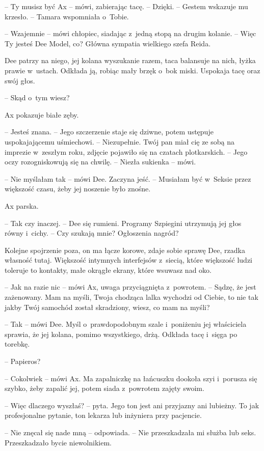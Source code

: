 \documentclass[oneside,polish,11pt,sfheadings]{mwbk}
\begin{document}
-- Ty musisz być Ax -- mówi, zabierając tacę. -- Dzięki. -- Gestem wskazuje
mu krzesło. -- Tamara wspomniała o~Tobie.

-- Wzajemnie -- mówi chłopiec, siadając z~jedną stopą na drugim kolanie. -- Więc Ty jesteś Dee Model, co? Główna sympatia wielkiego szefa Reida.

Dee patrzy na niego, jej kolana wyszukanie razem, taca balansuje na
nich, łyżka prawie w~ustach. Odkłada ją, robiąc mały brzęk o~bok miski.
Uspokaja tacę oraz swój głos.

-- Skąd o~tym wiesz?

Ax pokazuje białe zęby. 

-- Jesteś znana. -- Jego szczerzenie staje się
dziwne, potem ustępuje uspokajającemu uśmiechowi. -- Niezupełnie. Twój
pan miał cię ze sobą na imprezie w~zeszłym roku, zdjęcie pojawiło się na
czatach plotkarskich. -- Jego oczy rozogniskowują się na chwilę. -- Niezła
sukienka -- mówi.

-- Nie myślałam tak -- mówi Dee. Zaczyna jeść. -- Musiałam być w~Seksie
przez większość czasu, żeby jej noszenie było znośne.

Ax parska.

-- Tak czy inaczej. -- Dee się rumieni. Programy Szpiegini utrzymują jej
głos równy i~cichy. -- Czy szukają mnie? Ogłoszenia nagród?

Kolejne spojrzenie poza, on ma łącze korowe, zdaje sobie sprawę Dee,
rzadka własność tutaj. Większość intymnych interfejsów z~siecią, które
większość ludzi toleruje to kontakty, małe okrągłe ekrany, które wsuwasz
nad oko.

-- Jak na razie nic -- mówi Ax, uwaga przyciągnięta z~powrotem. -- Sądzę,
że jest zażenowany. Mam na myśli, Twoja chodząca lalka wychodzi od
Ciebie, to nie tak jakby Twój samochód został skradziony, wiesz, co mam
na myśli?

-- Tak -- mówi Dee. Myśl o~prawdopodobnym szale i~poniżeniu jej
właściciela sprawia, że jej kolana, pomimo wszystkiego, drżą. Odkłada
tacę i~sięga po torebkę.

-- Papieros?

-- Cokolwiek -- mówi Ax. Ma zapalniczkę na łańcuszku dookoła szyi i~porusza się szybko, żeby zapalić jej, potem siada z~powrotem zajęty
swoim.

-- Więc dlaczego wyszłaś? -- pyta. Jego ton jest ani przyjazny ani
lubieżny. To jak profesjonalne pytanie, ton lekarza lub inżyniera przy
pacjencie.

-- Nie znęcał się nade mną -- odpowiada. -- Nie przeszkadzała mi służba lub
seks. Przeszkadzało bycie niewolnikiem.
\end{document}
